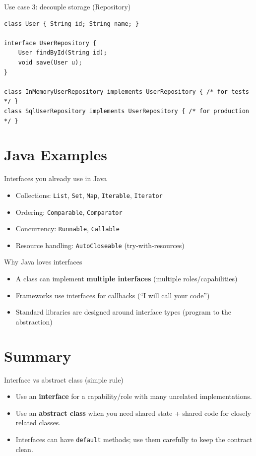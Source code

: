 \documentclass{beamer}
\begin{document}
\begin{frame}[fragile]{Use case 3: decouple storage (Repository)}
\begin{lstlisting}
class User { String id; String name; }

interface UserRepository {
    User findById(String id);
    void save(User u);
}

class InMemoryUserRepository implements UserRepository { /* for tests */ }
class SqlUserRepository implements UserRepository { /* for production */ }
\end{lstlisting}
\end{frame}

\section{Java Examples}
\label{sec:java}

\begin{frame}{Interfaces you already use in Java}
  \begin{itemize}[<+->]
    \item Collections: \texttt{List}, \texttt{Set}, \texttt{Map}, \texttt{Iterable}, \texttt{Iterator}
    \item Ordering: \texttt{Comparable}, \texttt{Comparator}
    \item Concurrency: \texttt{Runnable}, \texttt{Callable}
    \item Resource handling: \texttt{AutoCloseable} (try-with-resources)
  \end{itemize}
\end{frame}

\begin{frame}{Why Java loves interfaces}
  \begin{itemize}[<+->]
    \item A class can implement \textbf{multiple interfaces} (multiple roles/capabilities)
    \item Frameworks use interfaces for callbacks (``I will call your code'')
    \item Standard libraries are designed around interface types (program to the abstraction)
  \end{itemize}
\end{frame}

\section{Summary}
\label{sec:summary}

\begin{frame}{Interface vs abstract class (simple rule)}
  \begin{itemize}[<+->]
    \item Use an \textbf{interface} for a capability/role with many unrelated implementations.
    \item Use an \textbf{abstract class} when you need shared state + shared code for closely related classes.
    \item Interfaces can have \texttt{default} methods; use them carefully to keep the contract clean.
  \end{itemize}
\end{frame}
\end{document}
